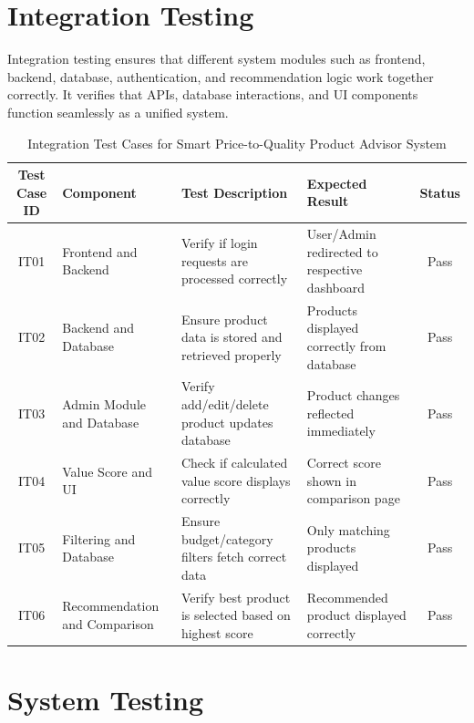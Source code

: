 \newpage
\section{Integration Testing}

Integration testing ensures that different system modules such as frontend, backend, database, authentication, and recommendation logic work together correctly. It verifies that APIs, database interactions, and UI components function seamlessly as a unified system.

\begin{table}[H]
    \centering
    \renewcommand{\arraystretch}{1.3}
    \small
    \begin{tabular}{|c|p{3cm}|p{3cm}|p{3cm}|c|}
        \hline
        \textbf{Test Case ID} & \textbf{Component} & \textbf{Test Description} & \textbf{Expected Result} & \textbf{Status} \\
        \hline
        IT01 & Frontend and Backend & Verify if login requests are processed correctly & User/Admin redirected to respective dashboard & Pass \\
        \hline
        IT02 & Backend and Database & Ensure product data is stored and retrieved properly & Products displayed correctly from database & Pass \\
        \hline
        IT03 & Admin Module and Database & Verify add/edit/delete product updates database & Product changes reflected immediately & Pass \\
        \hline
        IT04 & Value Score and UI & Check if calculated value score displays correctly & Correct score shown in comparison page & Pass \\
        \hline
        IT05 & Filtering and Database & Ensure budget/category filters fetch correct data & Only matching products displayed & Pass \\
        \hline
        IT06 & Recommendation and Comparison & Verify best product is selected based on highest score & Recommended product displayed correctly & Pass \\
        \hline
    \end{tabular}
    \caption{Integration Test Cases for Smart Price-to-Quality Product Advisor System}
    \label{tab:integration_tests}
\end{table}

\newpage
\section{System Testing}

